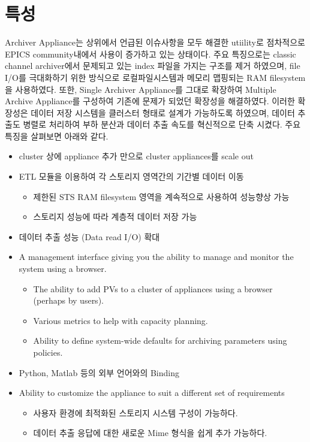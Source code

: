 \documentclass[11pt
  , a4paper
  , article
  , oneside
]{memoir}
\begin{document}
\section{특성}
Archiver Appliance\cite{appliance}는 상위에서 언급된 이슈사항을 모두 해결한 utiility로 점차적으로 EPICS community내에서 사용이 증가하고 있는 상태이다. 주요 특징으로는 classic channel archiver에서 문제되고 있는 index 파일을 가지는 구조를 제거 하였으며, file I/O를 극대화하기 위한 방식으로 로컬파일시스템과 메모리 맵핑되는 RAM filesystem을 사용하였다. 또한, Single Archiver Appliance를 그대로 확장하여 Multiple Archive Appliance를 구성하여 기존에 문제가 되었던 확장성을 해결하였다. 이러한 확장성은 데이터 저장 시스템을 클러스터 형태로 설계가 가능하도록 하였으며, 데이터 추출도 병렬로 처리하여 부하 분산과 데이터 추출 속도를 혁신적으로 단축 시켰다. 주요특징을 살펴보면 아래와 같다.
\begin{itemize}
	\item cluster 상에 appliance 추가 만으로 cluster appliances를 scale out
	\item ETL 모듈을 이용하여 각 스토리지 영역간의 기간별 데이터 이동
	\begin{itemize}
		\item 제한된 STS RAM filesystem 영역을 계속적으로 사용하여 성능향상 가능
		\item 스토리지 성능에 따라 계층적 데이터 저장 가능
	\end{itemize}
	\item 데이터 추출 성능 (Data read I/O) 확대
	\item A management interface giving you the ability to manage and monitor the system using a browser.
	\begin{itemize}
		\item The ability to add PVs to a cluster of appliances using a browser (perhaps by users).
		\item Various metrics to help with capacity planning.
		\item Ability to define system-wide defaults for archiving parameters using policies.
	\end{itemize}
	\item Python, Matlab 등의 외부 언어와의 Binding
	\item Ability to customize the appliance to suit a different set of requirements
	\begin{itemize}
		\item 사용자 환경에 최적화된 스토리지 시스템 구성이 가능하다.
		\item 데이터 추출 응답에 대한 새로운 Mime 형식을 쉽게 추가 가능하다.
		\end{itemize}
\end{itemize}
\end{document}
